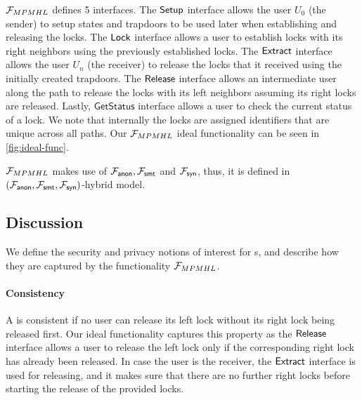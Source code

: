 $\mathcal{F}_{MPMHL}$ defines 5 interfaces. The $\mathsf{Setup}$ interface allows the user $U_0$ (the sender) 
to setup states and trapdoors to be used later when establishing and releasing the locks. The $\mathsf{Lock}$ 
interface allows a user to establish locks with its right neighbors using the previously established 
locks. The $\mathsf{Extract}$ interface allows the user $U_n$ (the receiver) to release the locks that it 
received using the initially created trapdoors. The $\mathsf{Release}$ interface allows an intermediate user 
along the path to release the locks with its left neighbors assuming its right locks are released. 
Lastly, $\mathsf{GetStatus}$ interface allows a user to check the current status of a lock. We note 
that internally the locks are assigned identifiers that are unique across all paths. Our $\mathcal{F}_{MPMHL}$ 
ideal functionality can be seen in \cref{fig:ideal-func}.

$\mathcal{F}_{MPMHL}$ makes use of $\mathcal{F}_{\mathsf{anon}}, \mathcal{F}_{\mathsf{smt}}$ and $\mathcal{F}_{\mathsf{syn}}$, thus, it is defined in 
$(\mathcal{F}_{\mathsf{anon}}, \mathcal{F}_{\mathsf{smt}}, \mathcal{F}_{\mathsf{syn}})$-hybrid model.

\subsection{Discussion}
\label{sec:discussion}


We define the security and privacy notions of interest for {\sysname}s, and describe how they 
are captured by the functionality $\mathcal{F}_{MPMHL}$.

\paragraph{Consistency} A \sysname is consistent if no user can release its left lock without its 
right lock being released first. Our ideal functionality captures this property as the $\mathsf{Release}$ 
interface allows a user to release the left lock only if the corresponding right lock has already 
been released. In case the user is the receiver, the $\mathsf{Extract}$ interface is used for releasing, 
and it makes sure that there are no further right locks before starting the release of the provided 
locks.


